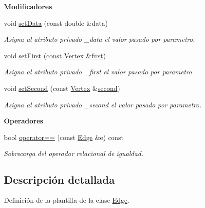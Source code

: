 \begin{Indent}{\bf Modificadores}\par
\begin{DoxyCompactItemize}
\item 
void \hyperlink{classedi_1_1Edge_a0a3d03f9b68bb170c83851885542fe81}{set\+Data} (const double \&data)
\begin{DoxyCompactList}\small\item\em Asigna al atributo privado \+\_\+data el valor pasado por parametro. \end{DoxyCompactList}\item 
void \hyperlink{classedi_1_1Edge_add3c3d74af84f7c841e35fc4cdc18b92}{set\+First} (const \hyperlink{classedi_1_1Vertex}{Vertex} \&\hyperlink{classedi_1_1Edge_a60f6ec38ddb0d047153617a9258c35e2}{first})
\begin{DoxyCompactList}\small\item\em Asigna al atributo privado \+\_\+first el valor pasado por parametro. \end{DoxyCompactList}\item 
void \hyperlink{classedi_1_1Edge_a23168fba337f88426b776b9b00e21ce4}{set\+Second} (const \hyperlink{classedi_1_1Vertex}{Vertex} \&\hyperlink{classedi_1_1Edge_ad7e0b8a3a7cb9b3e308e37348468c883}{second})
\begin{DoxyCompactList}\small\item\em Asigna al atributo privado \+\_\+second el valor pasado por parametro. \end{DoxyCompactList}\end{DoxyCompactItemize}
\end{Indent}
\begin{Indent}{\bf Operadores}\par
\begin{DoxyCompactItemize}
\item 
bool \hyperlink{classedi_1_1Edge_ab1bbb20a4ea2c016acd11a40376a3ffe}{operator==} (const \hyperlink{classedi_1_1Edge}{Edge} \&e) const 
\begin{DoxyCompactList}\small\item\em Sobrecarga del operador relacional de igualdad. \end{DoxyCompactList}\end{DoxyCompactItemize}
\end{Indent}


\subsection{Descripción detallada}
Definición de la plantilla de la clase \hyperlink{classedi_1_1Edge}{Edge}. 

